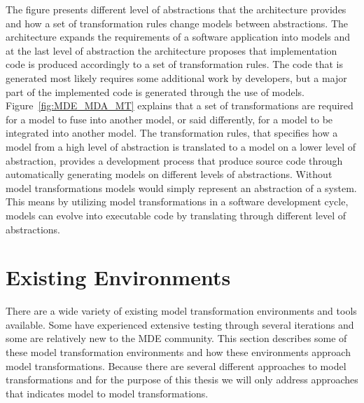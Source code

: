 The figure presents different level of abstractions that the architecture
provides and how a set of transformation rules change models between
abstractions. The architecture expands the requirements of a software application
into models and at the last level of abstraction the architecture proposes that
implementation code is produced accordingly to a set of transformation rules.
The code that is generated most likely requires some additional work by developers, but a major part of the
implemented code is generated through the use of models.
Figure~\ref{fig:MDE_MDA_MT} explains that a set of transformations are required
for a model to fuse into another model, or said differently, for a model to be
integrated into another model. The transformation rules, that specifies how a model from
a high level of abstraction is translated to a model on a lower level of
abstraction, provides a development process that produce source code
through automatically generating models on different levels of abstractions.
Without model transformations models would simply represent an abstraction of a
system. This means by utilizing model transformations in a software development
cycle, models can evolve into executable code by translating through different
level of abstractions.

\section{Existing Environments}
\label{tooling}

There are a wide variety of existing model transformation environments and
tools available. Some have experienced extensive testing through several
iterations and some are relatively new to the MDE community. This section
describes some of these model transformation environments and how these
environments approach model transformations. Because there are several different
approaches to model transformations and for the purpose of this thesis we will
only address approaches that indicates model to model transformations. 

